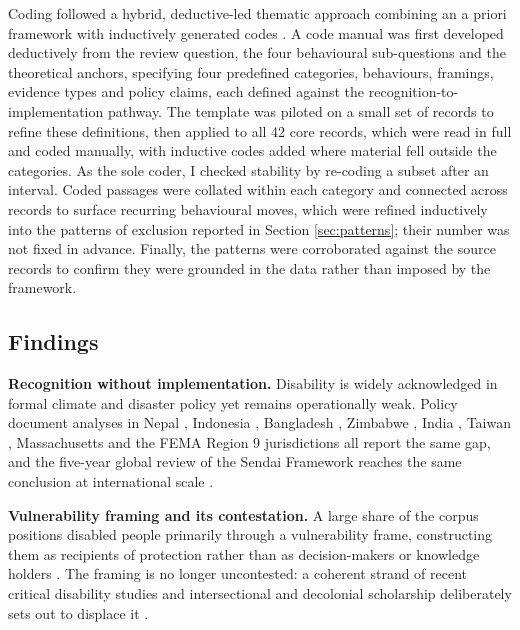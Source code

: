 \documentclass[12pt,a4paper]{report}
\begin{document}
Coding followed a hybrid, deductive-led thematic approach combining an a priori framework with inductively generated codes \cite{fereday2006demonstrating,azungah2018qualitative}. A code manual was first developed deductively from the review question, the four behavioural sub-questions and the theoretical anchors, specifying four predefined categories, behaviours, framings, evidence types and policy claims, each defined against the recognition-to-implementation pathway. The template was piloted on a small set of records to refine these definitions, then applied to all 42 core records, which were read in full and coded manually, with inductive codes added where material fell outside the categories. As the sole coder, I checked stability by re-coding a subset after an interval. Coded passages were collated within each category and connected across records to surface recurring behavioural moves, which were refined inductively into the patterns of exclusion reported in Section \ref{sec:patterns}; their number was not fixed in advance. Finally, the patterns were corroborated against the source records to confirm they were grounded in the data rather than imposed by the framework.


\subsection{Findings}
\textbf{Recognition without implementation.} Disability is widely acknowledged in formal climate and disaster policy yet remains operationally weak. Policy document analyses in Nepal \cite{devkota2023nepal}, Indonesia \cite{pertiwi2020indonesia}, Bangladesh \cite{islam2015bangladesh}, Zimbabwe \cite{lunga2019zimbabwe}, India \cite{hiranandani2015india}, Taiwan \cite{lee2019taiwan}, Massachusetts \cite{brown2025massachusetts} and the FEMA Region 9 jurisdictions \cite{gershon2021fema} all report the same gap, and the five-year global review of the Sendai Framework reaches the same conclusion at international scale \cite{bennettgayle2020sendai}.

\textbf{Vulnerability framing and its contestation.} A large share of the corpus positions disabled people primarily through a vulnerability frame, constructing them as recipients of protection rather than as decision-makers or knowledge holders \cite{sheknoble2023communicating,pertiwi2020indonesia,tagalo2020davao}. The framing is no longer uncontested: a coherent strand of recent critical disability studies and intersectional and decolonial scholarship deliberately sets out to displace it \cite{stjernholm2025critical,setijaningrum2024tokenism,pirmasari2023halinai,eriksen2025rock}.
\end{document}
